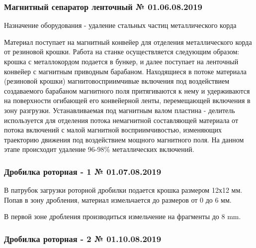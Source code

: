 \subsubsection{Магнитный сепаратор ленточный № 01.06.08.2019}

Назначение оборудования -  удаление стальных частиц металлического корда

\vspace{10mm}




Материал поступает на магнитный конвейер для отделения металлического корда от резиновой крошки. Работа на станке осуществляется следующим образом: крошка с металлокордом подается в бункер, и далее поступает на ленточный конвейер с магнитным приводным барабаном. Находящиеся в потоке материала (резиновой крошки) магнитовосприимчивые включения под воздействием создаваемого барабаном магнитного поля притягиваются к нему и удерживаются на поверхности огибающей его конвейерной ленты, перемещающей включения в зону разгрузки. Устанавливаемая под магнитным валом пластина - делитель используется для отделения потока немагнитной составляющей материала от потока включений с малой магнитной восприимчивостью, изменяющих траекторию движения под воздействием мощного магнитного поля. На данном этапе происходит удаление 96-98\% металлических включений.



\subsubsection{Дробилка роторная - 1 № 01.07.08.2019}

В патрубок загрузки роторной дробилки подается крошка размером 12х12 мм. Попав в зону дробления, материал измельчается до размеров от 0 до 6 мм.

В первой зоне дробления производиться измельчение на фрагменты до 8 mm.



\subsubsection{Дробилка роторная - 2 № 01.10.08.2019}

\vspace{10mm}
	
